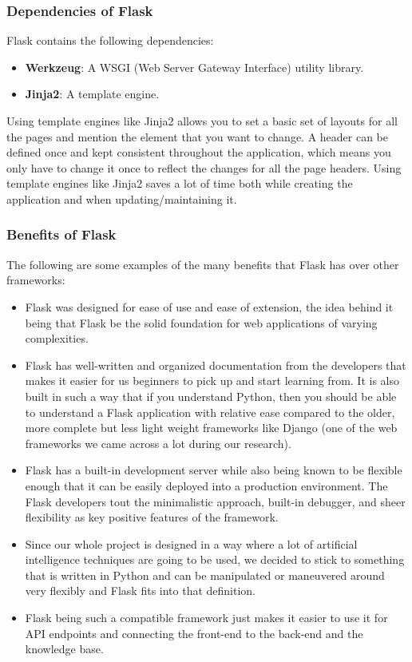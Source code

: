 \documentclass[titlepage, 12pt]{article}
\begin{document}
\subsubsection{Dependencies of Flask}

Flask contains the following dependencies:

\begin{itemize}
    \item \textbf{Werkzeug}: A WSGI (Web Server Gateway Interface) utility library.
    \item \textbf{Jinja2}: A template engine.
\end{itemize}
 
Using template engines like Jinja2 allows you to set a basic set of layouts for all the pages and mention the element that you want to change. A header can be defined once and kept consistent throughout the application, which means you only have to change it once to reflect the changes for all the page headers. Using template engines like Jinja2 saves a lot of time both while creating the application and when updating/maintaining it.

\subsubsection{Benefits of Flask}

The following are some examples of the many benefits that Flask has over other frameworks:

\begin{itemize}
    \item Flask was designed for ease of use and ease of extension, the idea behind it being that Flask be the solid foundation for web applications of varying complexities.
    \item Flask has well-written and organized documentation from the developers that makes it easier for us beginners to pick up and start learning from. It is also built in such a way that if you understand Python, then you should be able to understand a Flask application with relative ease compared to the older, more complete but less light weight frameworks like Django (one of the web frameworks we came across a lot during our research). 
    \item Flask has a built-in development server while also being known to be flexible enough that it can be easily deployed into a production environment. The Flask developers tout the minimalistic approach, built-in debugger, and sheer flexibility as key positive features of the framework.
    \item Since our whole project is designed in a way where a lot of artificial intelligence techniques are going to be used, we decided to stick to something that is written in Python and can be manipulated or maneuvered around very flexibly and Flask fits into that definition.
    \item Flask being such a compatible framework just makes it easier to use it for API endpoints and connecting the front-end to the back-end and the knowledge base.
\end{itemize}
\end{document}
